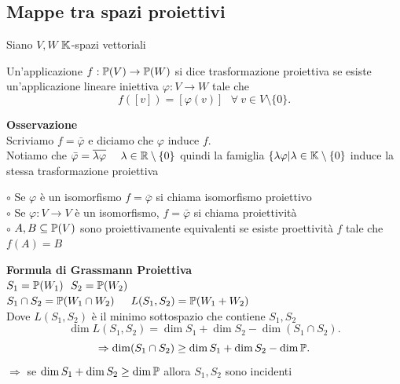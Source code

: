 \documentclass[12px]{article}
\begin{document}
\subsection{Mappe tra spazi proiettivi}
		Siano $V,W$ $\mathbb{K}$-spazi vettoriali
	\begin{defi}
		Un'applicazione $f:\mathbb{P}(V) \rightarrow\mathbb{P}(W)$ si dice trasformazione proiettiva se esiste un'applicazione lineare iniettiva $\varphi : V \rightarrow W$ tale che 
		\[
			f([v])=[ \varphi(v)] \ \ \ \forall \ v  \in V\setminus\{0\}
		.\] 
	\end{defi}
	\textbf{Osservazione}\\
	Scriviamo $f = \bar{\varphi}$ e diciamo che $\varphi$ induce $f$.\\
	Notiamo che $\bar{\varphi} = \overline{ \lambda \varphi} \ \ \ \ \lambda\in \mathbb{R}\setminus\{0\}$ quindi la famiglia $\{ \lambda \varphi | \lambda\in \mathbb{K}\setminus\{0\}$ induce la stessa trasformazione proiettiva
	\begin{nome}
		$\circ$ Se $\varphi$ è un isomorfismo $f=\bar \varphi$ si chiama isomorfismo proiettivo\\
		$\circ$ Se $\varphi : V \rightarrow V$ è un isomorfismo, $f=\bar \varphi$ si chiama proiettività\\
		$\circ$ $A,B\subseteq\mathbb{P}(V)$ sono proiettivamente equivalenti se esiste proettività $f$ tale che $f(A)=B$
	\end{nome}
	\textbf{Formula di Grassmann Proiettiva}\\
	$S_1 = \mathbb{P}(W_1) \ \ S_2 = \mathbb{P}(W_2)$\\
	$S_1\cap S_2=\mathbb{P}(W_1\cap W_2)$ $\ \ \ L(S_1,S_2) = \mathbb{P}(W_1+W_2)$\\
	Dove $L(S_1,S_2)$ è il minimo sottospazio che contiene $S_1,S_2$\\
	\[
	\dim L(S_1,S_2) = \dim S_1 + \dim S_2 - \dim (S_1\cap S_2)
	.\] 
	\[
	\Rightarrow \dim(S_1\cap S_2) \geq \dim S_1 + \dim S_2 - \dim\mathbb{P}
	.\] 
	$ \Rightarrow$  se $\dim S_1 + \dim S_2\geq \dim \mathbb{P}$ allora $S_1,S_2$ sono incidenti
\end{document}
